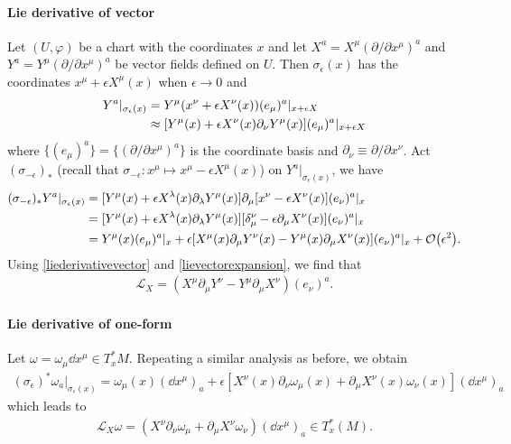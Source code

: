 \documentclass[10pt]{article}
\begin{document}
\paragraph{Lie derivative of vector}
Let $(U,\varphi)$ be a chart with the coordinates $x$ and let $X^a=X^\mu (\partial/\partial x^\mu)^a$ and $Y^a=Y^\mu(\partial/\partial x^\mu)^a$ be vector fields defined on $U$.
Then $\sigma_\epsilon(x)$ has the coordinates $x^\mu+\epsilon X^\mu(x)$ when $\epsilon\to0$ and
\begin{align}
    Y^a|_{\sigma_\epsilon(x)} & =Y^\mu (x^\nu+\epsilon X^\nu(x))(e_\mu)^a|_{x+\epsilon X}\notag                   \\
                              & \approx[Y^\mu(x)+\epsilon X^\nu(x)\partial_\nu Y^\mu(x)](e_\mu)^a|_{x+\epsilon X}
\end{align}
where $\{(e_\mu)^a\}=\{(\partial/\partial x^\mu)^a\}$ is the coordinate basis and $\partial_\nu\equiv \partial/\partial x^\nu$.
Act $(\sigma_{-\epsilon})_*$ (recall that $\sigma_{-\epsilon}:x^\mu\mapsto x^\mu-\epsilon X^\mu(x)$) on $Y^a|_{\sigma_\epsilon(x)}$, we have
\begin{align}
    (\sigma_{-\epsilon})_*Y^a|_{\sigma_\epsilon(x)} & =[Y^\mu(x)+\epsilon X^\lambda(x)\partial_\lambda Y^\mu(x)]\partial_\mu[x^\nu-\epsilon X^\nu(x)](e_\nu)^a|_x\notag                                     \\
                                                    & =[Y^\mu(x)+\epsilon X^\lambda(x)\partial_\lambda Y^\mu(x)][\delta^\nu_\mu-\epsilon\partial_\mu X^\nu(x)](e_\nu)^a|_x\notag                            \\
                                                    & =Y^\mu(x)(e_\mu)^a|_x+\epsilon[X^\mu(x)\partial_\mu Y^\nu(x)-Y^\mu(x)\partial_\mu X^\nu(x)](e_\nu)^a|_x+\order{\epsilon^2}.\label{lievectorexpansion}
\end{align}
Using \cref{liederivativevector} and \cref{lievectorexpansion}, we find that
\begin{align}
    \mathcal{L}_X=\left(X^\mu\partial_\mu Y^\nu-Y^\mu \partial_\mu X^\nu\right)(e_\nu)^a.
\end{align}

\paragraph{Lie derivative of one-form}Let $\omega=\omega_\mu\dd{x^\mu}\in T^{*}_x M$.
Repeating a similar analysis as before, we obtain
\begin{align}
    (\sigma_\epsilon)^*\omega_a|_{\sigma_\epsilon(x)}=\omega_\mu(x)(\dd{x^\mu})_a+\epsilon\left[X^\nu(x)\partial_\nu\omega_\mu(x)+\partial_\mu X^\nu(x)\omega_\nu(x)\right](\dd{x^\mu})_a
\end{align}
which leads to
\begin{align}
    \mathcal{L}_X\omega=\left(X^\nu\partial_\nu\omega_\mu+\partial_\mu X^\nu\omega_\nu\right)(\dd{x^\mu})_a\in T^*_x(M).
\end{align}
\end{document}

